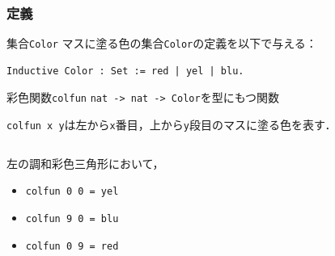 \documentclass[dvipdfmx,cjk]{beamer}
\begin{document}
\begin{frame}[fragile]
  \frametitle{定義}
  \begin{block}{集合{\tt{Color}}}
    マスに塗る色の集合{\tt{Color}}の定義を以下で与える：
    \begin{lstlisting}[language=Coq]
      Inductive Color : Set := red | yel | blu.
    \end{lstlisting}
  \end{block}
  \begin{block}{彩色関数{\tt{colfun}}}
    {\tt{nat -> nat -> Color}}を型にもつ関数
  \end{block}
  {\tt{colfun x y}}は左から{\tt{x}}番目，上から{\tt{y}}段目のマスに塗る色を表す．
  \vfill  
  \begin{minipage}{0.45\hsize}
  \[
  
  \]
  \end{minipage}
  \begin{minipage}{0.45\hsize}
    左の調和彩色三角形において，
    \begin{itemize}
    \item
      {\tt{colfun 0 0 = yel}}
    \item
      {\tt{colfun 9 0 = blu}}
    \item
      {\tt{colfun 0 9 = red}}
    \end{itemize}
    \hfill
  \end{minipage}
\end{frame}
\end{document}
